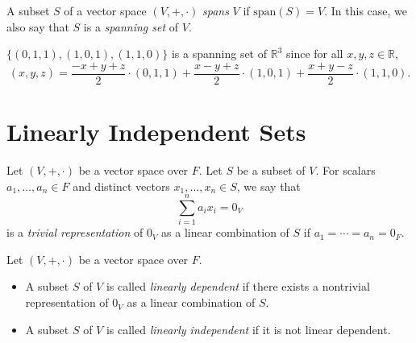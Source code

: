 \begin{definition}\label{def:spanning-set}
  A subset $S$ of a vector space $(V, +, \cdot)$ \emph{spans} $V$
  if $\mathrm{span}(S) = V$.
  In this case, we also say that $S$ is a \emph{spanning set} of $V$.
\end{definition}

\begin{example}
  $\{(0, 1, 1), (1, 0, 1), (1, 1, 0)\}$ is a spanning set of $\mathbb{R}^3$
  since for all $x, y, z \in \mathbb{R}$,
  \begin{equation*}
    (x, y, z)
      = \frac{-x+y+z}{2} \cdot (0, 1, 1)
      + \frac{x-y+z}{2} \cdot (1, 0, 1)
      + \frac{x+y-z}{2} \cdot (1, 1, 0).
  \end{equation*}
\end{example}

\section{Linearly Independent Sets}
\begin{definition}
  Let $(V, +, \cdot)$ be a vector space over $F$.
  Let $S$ be a subset of $V$.
  For scalars $a_1, \dots, a_n \in F$ and distinct vectors
  $x_1, \dots, x_n \in S$, we say that
  \begin{equation*}
    \sum_{i=1}^n a_ix_i = 0_V
  \end{equation*}
  is a \emph{trivial representation} of $0_V$ as a linear combination of $S$
  if $a_1 = \cdots = a_n = 0_F$.
\end{definition}

\begin{definition}
  Let $(V, +, \cdot)$ be a vector space over $F$.
  \begin{itemize}
    \item A subset $S$ of $V$ is called \emph{linearly dependent} if there
      exists a nontrivial representation of $0_V$ as a linear combination of
      $S$.
    \item A subset $S$ of $V$ is called \emph{linearly independent} if
      it is not linear dependent.
  \end{itemize}
\end{definition}

